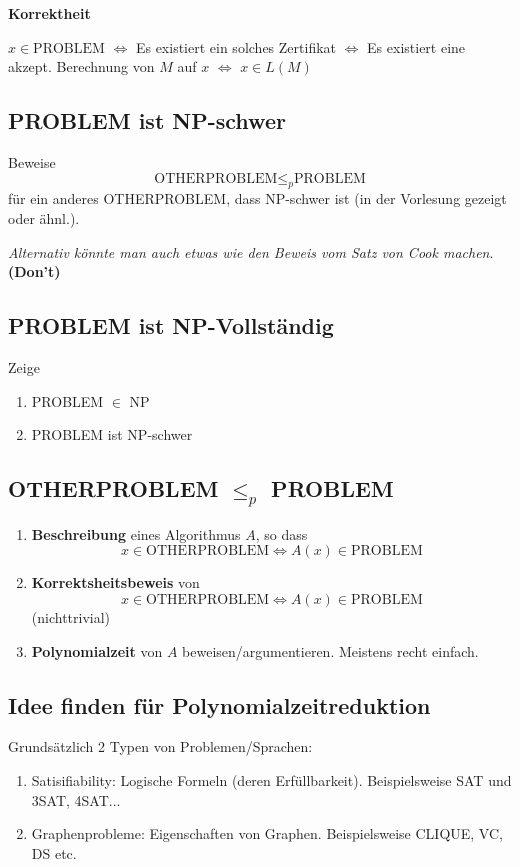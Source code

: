 \documentclass[a4paper, 11pt]{article}
\begin{document}
	\textbf{Korrektheit}
	
	$x \in \text{PROBLEM}$ $\iff$ Es existiert ein solches Zertifikat $\iff$ Es existiert eine akzept. Berechnung von $M$ auf $x$ $\iff$ $x \in L(M)$ 

\subsection{PROBLEM ist NP-schwer}
	Beweise $$\text{OTHERPROBLEM} \leq_p \text{PROBLEM}$$
	für ein anderes OTHERPROBLEM, dass NP-schwer ist (in der Vorlesung gezeigt oder ähnl.).

	\textit{Alternativ könnte man auch etwas wie den Beweis vom Satz von Cook machen}. \textbf{(Don't)}

\subsection{PROBLEM ist NP-Vollständig}
	Zeige 
	\begin{enumerate}[label=\arabic*]
		\item PROBLEM $\in $ NP
		\item PROBLEM ist NP-schwer
	\end{enumerate}

	\subsection{OTHERPROBLEM $\leq_p$ PROBLEM}
	\begin{enumerate}[label=\arabic*.]
		
		\item \textbf{Beschreibung} eines Algorithmus $A$, so dass 
		$$x \in \text{OTHERPROBLEM} \iff A(x) \in \text{PROBLEM}$$
		
		\item \textbf{Korrektsheitsbeweis} von 
		$$x \in \text{OTHERPROBLEM} \iff A(x) \in \text{PROBLEM}$$
		(nichttrivial)
		
		\item \textbf{Polynomialzeit} von $A$ beweisen/argumentieren. Meistens recht einfach. 
	\end{enumerate}

\subsection{Idee finden für Polynomialzeitreduktion}
	Grundsätzlich 2 Typen von Problemen/Sprachen:
	\begin{enumerate}[label=\arabic*]
		\item Satisifiability: Logische Formeln (deren Erfüllbarkeit). Beispielsweise SAT und 3SAT, 4SAT...
		\item Graphenprobleme: Eigenschaften von Graphen. Beispielsweise CLIQUE, VC, DS etc.
	\end{enumerate}
\end{document}

